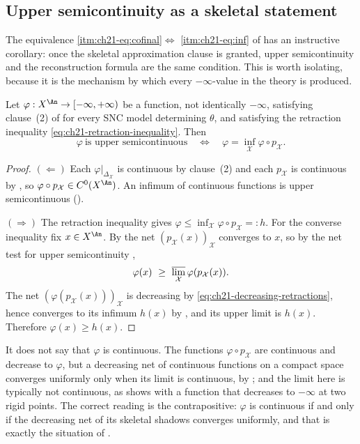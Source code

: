 \subsection{Upper semicontinuity as a skeletal statement}
\label{sec:ch21-usc-skeletal}

The equivalence \cref{itm:ch21-eq:cofinal}\(\Leftrightarrow\)
\cref{itm:ch21-eq:inf} of  has an instructive
corollary: once the skeletal approximation clause is granted, upper
semicontinuity and the reconstruction formula are the same condition.  This
is worth isolating, because it is the mechanism by which every
\(-\infty\)-value in the theory is produced.

\begin{proposition}
\label{prop:ch21-usc-iff-inf}
Let \(\varphi:X^{\An}\to[-\infty,+\infty)\) be a function, not identically
\(-\infty\), satisfying clause~(2) of  for every SNC
model determining \(\theta\), and satisfying the retraction inequality
\eqref{eq:ch21-retraction-inequality}.  Then
\[
 \varphi\ \text{is upper semicontinuous}
 \quad\Longleftrightarrow\quad
 \varphi=\inf_{\mathcal X}\varphi\circ p_{\mathcal X}.
\]
\end{proposition}

\begin{proof}
\((\Leftarrow)\)  Each \(\varphi|_{\Delta_{\mathcal X}}\) is continuous by
clause~(2) and each \(p_{\mathcal X}\) is continuous by
, so \(\varphi\circ p_{\mathcal X}\in
C^0(X^{\An})\).  An infimum of continuous functions is upper
semicontinuous ().

\((\Rightarrow)\)  The retraction inequality gives
\(\varphi\leq\inf_{\mathcal X}\varphi\circ p_{\mathcal X}=:h\).  For the
converse inequality fix \(x\in X^{\An}\).  By
 the net \((p_{\mathcal X}(x))_{\mathcal X}\)
converges to \(x\), so by the net test for upper semicontinuity
,
\[
 \varphi(x)\ \geq\ \varlimsup_{\mathcal X}\varphi(p_{\mathcal X}(x)).
\]
The net \((\varphi(p_{\mathcal X}(x)))_{\mathcal X}\) is decreasing by
\eqref{eq:ch21-decreasing-retractions}, hence converges to its infimum
\(h(x)\) by , and its upper limit is
\(h(x)\).  Therefore \(\varphi(x)\geq h(x)\).
\end{proof}

\begin{remark}
\label{rem:ch21-usc-not-continuity}
It does not say that \(\varphi\) is continuous.  The functions
\(\varphi\circ p_{\mathcal X}\) are continuous and decrease to \(\varphi\),
but a decreasing net of continuous functions on a compact space converges
uniformly only when its limit is continuous, by
; and the limit here is typically not continuous, as
 shows with a function that decreases to
\(-\infty\) at two rigid points.  The correct reading is the
contrapositive: \(\varphi\) is continuous if and only if the decreasing net
of its skeletal shadows converges uniformly, and that is exactly the
situation of .
\end{remark}

